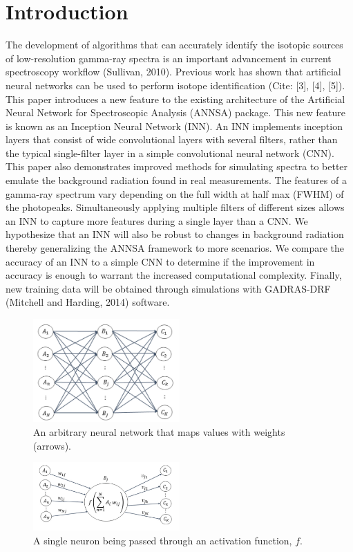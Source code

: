 \documentclass[11pt]{article}
\begin{document}
\section{Introduction}
The development of algorithms that can accurately identify the isotopic sources of low-resolution gamma-ray 
spectra is an important advancement in  current spectroscopy workflow (Sullivan, 2010).
Previous work has shown that artificial neural networks can be used to perform isotope identification (Cite: [3], [4], [5]). This paper introduces a new feature to the existing architecture of the Artificial Neural Network for Spectroscopic Analysis (ANNSA) package. This new feature is known as an Inception Neural Network (INN). An INN implements inception layers that consist of wide convolutional layers with several filters, rather than the typical single-filter layer in a simple convolutional neural network (CNN).
This paper also demonstrates improved methods for simulating spectra to better emulate the background radiation found in real measurements. 
The features of a gamma-ray spectrum vary depending on the full width at half max (FWHM) of the photopeaks. 
Simultaneously applying multiple filters of different sizes allows an INN to capture more features during a single layer than a CNN. 
We hypothesize that an INN will also be robust to changes in background radiation thereby generalizing the ANNSA framework to more scenarios. 
We compare the accuracy of an INN to a simple CNN to determine if the improvement in accuracy is enough to warrant the increased computational complexity. 
Finally, new training data will be obtained through simulations with GADRAS-DRF (Mitchell and Harding, 2014) software.


\begin{figure}[h]
\centering
\includegraphics[width=0.5\textwidth]{dense-layer-figure.png}
\caption{An arbitrary neural network that maps values with weights (arrows).}
\label{fig:dense-nn}
\end{figure}
\begin{figure}[h]
\centering
\includegraphics[width=0.5\textwidth]{neuron-figure.png}
\caption{A single neuron being passed through an activation function, $\textit{f}$.}
\label{fig:neuron}
\end{figure}
\end{document}

